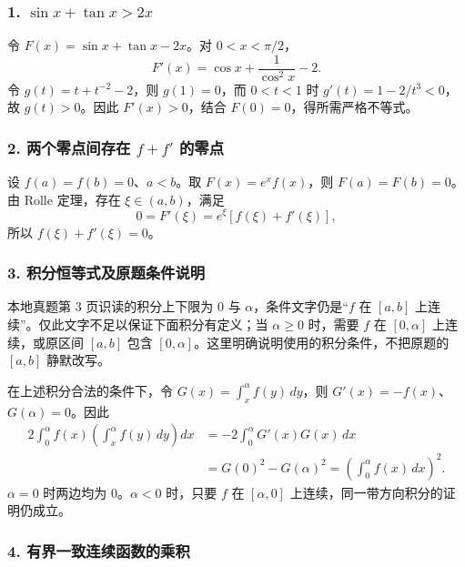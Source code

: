 \documentclass[11pt,fontset=fandol]{ctexart}
\begin{document}
\subsubsection{\texorpdfstring{1.
\(\sin x+\tan x>2x\)}{1. \textbackslash sin x+\textbackslash tan x\textgreater2x}}\label{sin-xtan-x2x}

令 \(F(x)=\sin x+\tan x-2x\)。对 \(0<x<\pi/2\)， \[
F'(x)=\cos x+\frac1{\cos^2x}-2.
\] 令 \(g(t)=t+t^{-2}-2\)，则 \(g(1)=0\)，而 \(0<t<1\) 时
\(g'(t)=1-2/t^3<0\)，故 \(g(t)>0\)。因此 \(F'(x)>0\)，结合
\(F(0)=0\)，得所需严格不等式。

\subsubsection{\texorpdfstring{2. 两个零点间存在 \(f+f'\)
的零点}{2. 两个零点间存在 f+f\textquotesingle{} 的零点}}\label{ux4e24ux4e2aux96f6ux70b9ux95f4ux5b58ux5728-ff-ux7684ux96f6ux70b9}

设 \(f(a)=f(b)=0\)、\(a<b\)。取 \(F(x)=e^xf(x)\)，则 \(F(a)=F(b)=0\)。由
Rolle 定理，存在 \(\xi\in(a,b)\)，满足 \[
0=F'(\xi)=e^\xi[f(\xi)+f'(\xi)],
\] 所以 \(f(\xi)+f'(\xi)=0\)。

\subsubsection{3.
积分恒等式及原题条件说明}\label{ux79efux5206ux6052ux7b49ux5f0fux53caux539fux9898ux6761ux4ef6ux8bf4ux660e}

本地真题第 3 页识读的积分上下限为 \(0\) 与
\(\alpha\)，条件文字仍是``\(f\) 在 \([a,b]\)
上连续''。仅此文字不足以保证下面积分有定义；当 \(\alpha\geq0\) 时，需要
\(f\) 在 \([0,\alpha]\) 上连续，或原区间 \([a,b]\) 包含
\([0,\alpha]\)。这里明确说明使用的积分条件，不把原题的 \([a,b]\)
静默改写。

在上述积分合法的条件下，令 \(G(x)=\int_x^\alpha f(y)\,dy\)，则
\(G'(x)=-f(x)\)、\(G(\alpha)=0\)。因此 \[
\begin{aligned}
2\int_0^\alpha f(x)\left(\int_x^\alpha f(y)\,dy\right)dx
&=-2\int_0^\alpha G'(x)G(x)\,dx\\
&=G(0)^2-G(\alpha)^2
=\left(\int_0^\alpha f(x)\,dx\right)^2.
\end{aligned}
\] \(\alpha=0\) 时两边均为 0。\(\alpha<0\) 时，只要 \(f\) 在
\([\alpha,0]\) 上连续，同一带方向积分的证明仍成立。

\subsubsection{4.
有界一致连续函数的乘积}\label{ux6709ux754cux4e00ux81f4ux8fdeux7eedux51fdux6570ux7684ux4e58ux79ef}
\end{document}
